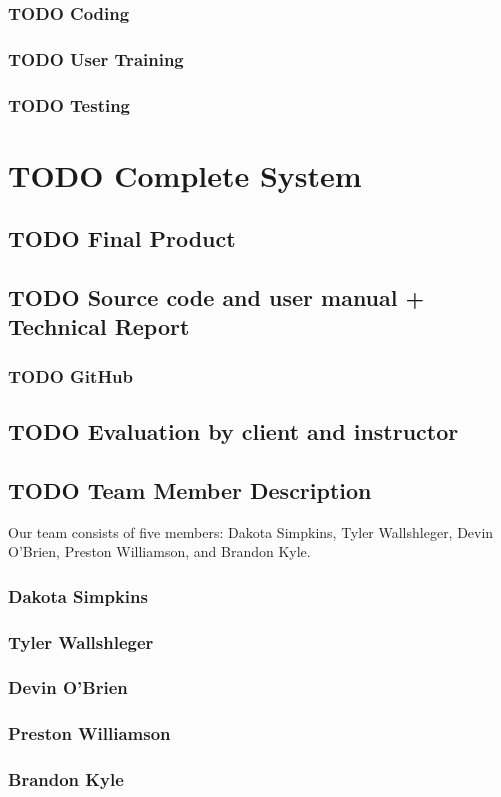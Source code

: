 \documentclass[11pt]{article}
\begin{document}
\subsubsection{{\bfseries\sffamily TODO} Coding}
\label{sec:org5489cb3}
\subsubsection{{\bfseries\sffamily TODO} User Training}
\label{sec:orga8e200d}
\subsubsection{{\bfseries\sffamily TODO} Testing}
\label{sec:org40acb1e}
\section{{\bfseries\sffamily TODO} Complete System}
\label{sec:org3d58669}
\subsection{{\bfseries\sffamily TODO} Final Product}
\label{sec:orgcd61ea7}
\subsection{{\bfseries\sffamily TODO} Source code and user manual + Technical Report}
\label{sec:orgda4a77d}
\subsubsection{{\bfseries\sffamily TODO} GitHub}
\label{sec:org43d3ab7}
\subsection{{\bfseries\sffamily TODO} Evaluation by client and instructor}
\label{sec:org1606757}

\subsection{{\bfseries\sffamily TODO} Team Member Description}
\label{sec:org6928c4f}
Our team consists of five members: Dakota Simpkins, Tyler Wallshleger,
Devin O'Brien, Preston Williamson, and Brandon Kyle.
\subsubsection{Dakota Simpkins}
\label{sec:orgb02a76e}
\subsubsection{Tyler Wallshleger}
\label{sec:org6bd0253}
\subsubsection{Devin O'Brien}
\label{sec:org922d0b8}
\subsubsection{Preston Williamson}
\label{sec:orgc28b3d8}
\subsubsection{Brandon Kyle}
\label{sec:org494de6e}
\end{document}
